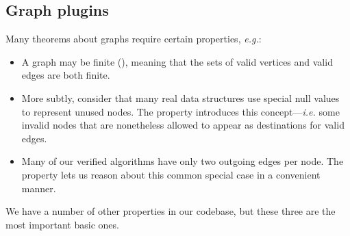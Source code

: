 \subsection{Graph plugins}

\label{subsec:graphplugins}
Many theorems about graphs require certain properties, \emph{e.g.}:
\begin{itemize}
\vspace{-1ex}
\item A graph may be finite (), meaning that the sets of valid vertices and valid edges are both finite.
\vspace{-1ex}
\item More subtly, consider that many real data structures use special null values to represent unused nodes.  The  property introduces this concept---\emph{i.e.} some invalid nodes that are nonetheless allowed to appear as destinations for valid edges.
\vspace{-1ex}
\item Many of our verified algorithms have only two outgoing edges per node.  The  property lets us reason about this common special case in a convenient manner.
\vspace{-1ex}
\end{itemize}
We have a number of other properties in our codebase, but these three are the most important basic ones.


